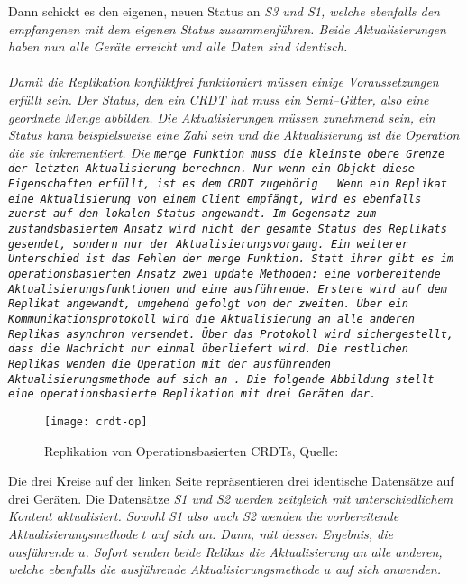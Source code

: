 Dann schickt es den eigenen, neuen Status an \it{S3} und \it{S1}, welche ebenfalls den empfangenen mit dem eigenen Status zusammenführen. Beide Aktualisierungen haben nun alle Geräte erreicht und alle Daten sind identisch.\\\\
%
Damit die Replikation konfliktfrei funktioniert müssen einige Voraussetzungen erfüllt sein.
Der Status, den ein \gls{CRDT} hat muss ein Semi--Gitter, also eine geordnete Menge abbilden.
Die Aktualisierungen müssen zunehmend sein, ein Status kann beispielsweise eine Zahl sein und die Aktualisierung ist die Operation die sie inkrementiert.
Die \tt{merge} Funktion muss die kleinste obere Grenze der letzten Aktualisierung berechnen.
Nur wenn ein Objekt diese Eigenschaften erfüllt, ist es dem \gls{CRDT} zugehörig ~\cite{crdt_shapiro2}
%
%
%
Wenn ein Replikat eine Aktualisierung von einem Client empfängt, wird es ebenfalls zuerst auf den lokalen Status angewandt.
Im Gegensatz zum zustandsbasiertem Ansatz wird nicht der gesamte Status des Replikats gesendet, sondern nur der Aktualisierungsvorgang.
Ein weiterer Unterschied ist das Fehlen der \tt{merge} Funktion. Statt ihrer gibt es im operationsbasierten Ansatz zwei \tt{update} Methoden: eine vorbereitende Aktualisierungsfunktionen und eine ausführende. Erstere wird auf dem Replikat angewandt, umgehend gefolgt von der zweiten.
Über ein Kommunikationsprotokoll wird die Aktualisierung an alle anderen Replikas asynchron versendet.
Über das Protokoll wird sichergestellt, dass die Nachricht nur einmal überliefert wird.
Die restlichen Replikas wenden die Operation mit der ausführenden Aktualisierungsmethode auf sich an~\cite{crdt_shapiro2}.
Die folgende Abbildung stellt eine operationsbasierte Replikation mit drei Geräten dar.
%
\begin{figure}[H]
  \centering
  \texttt{[image: crdt-op]}
  \grayRule
  \caption[Replikation von Operationsbasierten \gls{CRDT}]{Replikation von Operationsbasierten \glspl{CRDT}, Quelle: ~\cite{crdt_shapiro2}}
  \label{fig:crdt-op}
\end{figure}
%
Die drei Kreise auf der linken Seite repräsentieren drei identische Datensätze auf drei Geräten. Die Datensätze \it{S1} und \it{S2} werden zeitgleich mit unterschiedlichem Kontent aktualisiert.
Sowohl \it{S1} also auch \it{S2} wenden die vorbereitende Aktualisierungsmethode $t$ auf sich an.
Dann, mit dessen Ergebnis, die ausführende $u$.
Sofort senden beide Relikas die Aktualisierung an alle anderen, welche ebenfalls die ausführende Aktualisierungsmethode $u$ auf sich anwenden.\\\\

